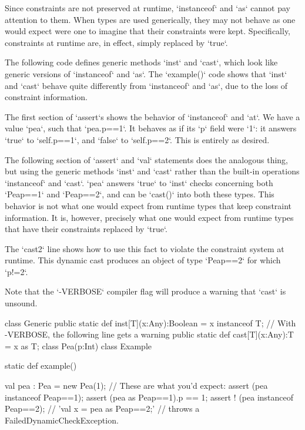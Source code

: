 \label{sect:StrippedGenericCasts}

Since constraints are not preserved at runtime, \xcd`instanceof` and \xcd`as`
cannot pay attention to them.  When types are used generically,
they may not behave as one would expect were one to imagine that their
constraints were kept.  Specifically, constraints at runtime are, in effect,
simply replaced by \xcd`true`.

\begin{ex}
The following code defines generic methods \xcd`inst` and \xcd`cast`, which
look like generic versions of \xcd`instanceof` and \xcd`as`.  The
\xcd`example()` code shows that \xcd`inst` and \xcd`cast` behave quite
differently from \xcd`instanceof` and \xcd`as`, due to the loss of constraint
information.  

The first section of \xcd`assert`s shows the behavior of \xcd`instanceof` and
\xcd`at`.  We have a value \xcd`pea`, such that \xcd`pea.p==1`.
It behaves as if its \xcd`p` field were \xcd`1`: it answers \xcd`true` to 
\xcd`self.p==1`, and \xcd`false` to \xcd`self.p==2`.  This is entirely as
desired.

The following section of \xcd`assert` and \xcd`val` statements does the
analogous thing, but using the generic methods \xcd`inst` and \xcd`cast`
rather than the built-in operations \xcd`instanceof` and \xcd`cast`.
\xcd`pea` answers \xcd`true` to \xcd`inst` checks concerning both
\xcd`Pea{p==1}` and \xcd`Pea{p==2}`, and can be \xcd`cast()` into both these
types.  This behavior is not what one would expect from runtime types that
keep constraint information.  It is, however, precisely what one would expect
from runtime types that have their constraints replaced by \xcd`true`.  

The \xcd`cast2` line shows how to use this fact to violate the constraint
system at runtime.   This dynamic cast produces an object of type
\xcd`Pea{p==2}` for which \xcd`p!=2`.  

Note that the \xcd`-VERBOSE` compiler flag will produce a warning that 
\xcd`cast` is unsound.  

\begin{xten}
class Generic {
  public static def inst[T](x:Any):Boolean = x instanceof T;
  // With -VERBOSE, the following line gets a warning
  public static def cast[T](x:Any):T       = x as T;
}
class Pea(p:Int) {}
class Example{
  static def example() {
     val pea : Pea = new Pea(1);
     // These are what you'd expect: 
     assert (pea instanceof Pea{p==1});
     assert (pea as Pea{p==1}).p == 1;
     assert ! (pea instanceof Pea{p==2}); 
     // 'val x = pea as Pea{p==2};' 
     // throws a FailedDynamicCheckException.

}}
\end{xten}
\end{ex}
